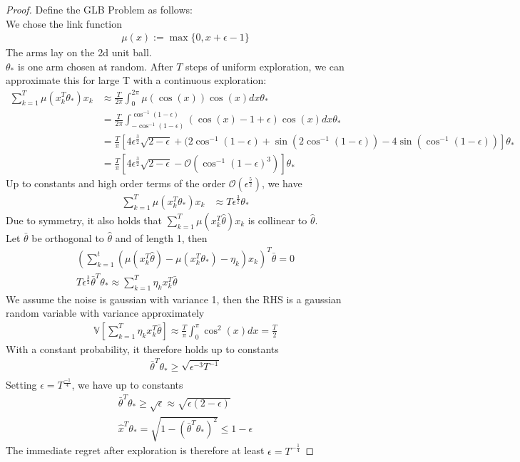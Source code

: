 \begin{proof}
    Define the GLB Problem as follows:\\
    We chose the link function 
    \begin{align}
        \mu(x) := \max\{0, x+\epsilon-1\}
    \end{align}
    The arms lay on the 2d unit ball.\\
    $\theta_*$ is one arm chosen at random.
    After $T$ steps of uniform exploration, we can approximate this for large T with a continuous exploration:
    \begin{align*}
        \sum_{k=1}^T\mu(x_k^T\theta_*)x_k&\approx \frac{T}{2\pi}\int_0^{2\pi} \mu(\cos(x))\cos(x)dx\theta_*\\
        &=\frac{T}{2\pi}\int_{-\cos^{-1}(1-\epsilon)}^{\cos^{-1}(1-\epsilon)} (\cos(x)-1+\epsilon)\cos(x)dx\theta_*\\
        &=\frac{T}{\pi}\left[4\epsilon^{\frac{3}{2}}\sqrt{2-\epsilon}+(2\cos^{-1}(1-\epsilon)+\sin(2\cos^{-1}(1-\epsilon))-4\sin(\cos^{-1}(1-\epsilon))\right]\theta_*\\
        &=\frac{T}{\pi}\left[4\epsilon^{\frac{3}{2}}\sqrt{2-\epsilon} -\mathcal{O}(\cos^{-1}(1-\epsilon)^3)\right]\theta_*
    \end{align*}
    Up to constants and high order terms of the order $\mathcal{O}(\epsilon^\frac{5}{2})$, we have
    \begin{align*}
        \sum_{k=1}^T\mu(x_k^T\theta_*)x_k&\approx T\epsilon^{\frac{3}{2}}\theta_*
    \end{align*}
    Due to symmetry, it also holds that $\sum_{k=1}^T\mu(x_k^T\hat{\theta})x_k$ is collinear to $\hat{\theta}$.\\
    Let $\bar{\theta}$ be orthogonal to $\hat{\theta}$ and of length 1, then
    \begin{align*}
        (\sum_{k=1}^t(\mu(x_k^T\hat{\theta})-\mu(x_k^T\theta_*)-\eta_k)x_k)^T\bar{\theta}=0\\
        T\epsilon^{\frac{3}{2}}\bar{\theta}^T\theta_* \approx \sum_{k=1}^T\eta_k x_k^T\bar{\theta}
    \end{align*}
    We assume the noise is gaussian with variance 1, then the RHS is a gaussian random variable with variance approximately
    \begin{align*}
        \mathbb{V}\left[\sum_{k=1}^T\eta_k x_k^T\bar{\theta}\right] \approx \frac{T}{\pi}\int_0^\pi \cos^2(x)dx =\frac{T}{2}
    \end{align*}
    With a constant probability, it therefore holds up to constants
    \begin{align*}
        \bar{\theta}^T\theta_* \geq \sqrt{\epsilon^{-3}T^{-1}}\\
    \end{align*}
    Setting $\epsilon= T^{\frac{-1}{4}}$, we have up to constants
    \begin{align*}
        \bar{\theta}^T\theta_* \geq \sqrt{\epsilon} \approx \sqrt{\epsilon(2-\epsilon)}\\
    \hat{x}^T\theta_* = \sqrt{1-(\bar{\theta}^T\theta_*)^2} \leq 1-\epsilon
    \end{align*}
    The immediate regret after exploration is therefore at least $\epsilon =T^{-\frac{1}{4}}$
    
\end{proof}

